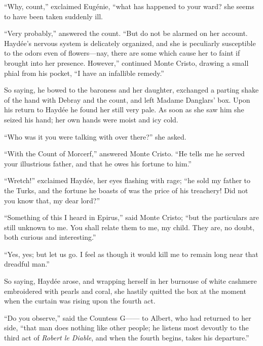 “Why, count,” exclaimed Eugénie, “what has happened to your ward? she
seems to have been taken suddenly ill.

“Very probably,” answered the count. “But do not be alarmed on her
account. Haydée’s nervous system is delicately organized, and she is
peculiarly susceptible to the odors even of flowers—nay, there are some
which cause her to faint if brought into her presence. However,”
continued Monte Cristo, drawing a small phial from his pocket, “I have
an infallible remedy.”

So saying, he bowed to the baroness and her daughter, exchanged a
parting shake of the hand with Debray and the count, and left Madame
Danglars’ box. Upon his return to Haydée he found her still very pale.
As soon as she saw him she seized his hand; her own hands were moist
and icy cold.

“Who was it you were talking with over there?” she asked.

“With the Count of Morcerf,” answered Monte Cristo. “He tells me he
served your illustrious father, and that he owes his fortune to him.”

“Wretch!” exclaimed Haydée, her eyes flashing with rage; “he sold my
father to the Turks, and the fortune he boasts of was the price of his
treachery! Did not you know that, my dear lord?”

“Something of this I heard in Epirus,” said Monte Cristo; “but the
particulars are still unknown to me. You shall relate them to me, my
child. They are, no doubt, both curious and interesting.”

“Yes, yes; but let us go. I feel as though it would kill me to remain
long near that dreadful man.”

So saying, Haydée arose, and wrapping herself in her burnouse of white
cashmere embroidered with pearls and coral, she hastily quitted the box
at the moment when the curtain was rising upon the fourth act.

“Do you observe,” said the Countess G—— to Albert, who had returned to
her side, “that man does nothing like other people; he listens most
devoutly to the third act of \textit{Robert le Diable}, and when the fourth
begins, takes his departure.”
